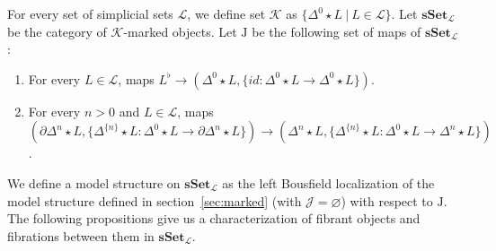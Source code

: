 \documentclass[reqno]{amsart}
\theoremstyle{definition}
\theoremstyle{remark}
\newcommand{\cat}[1]{\mathbf{#1}}
\newcommand{\sSet}{\cat{sSet}}
\newcommand{\K}{$\mathcal{K}$}
\newcommand{\join}{\star}
\newcommand{\J}{\mathrm{J}}
\numberwithin{figure}{section}
\begin{document}
For every set of simplicial sets $\mathcal{L}$, we define set $\mathcal{K}$ as $\{ \Delta^0 \join L\ |\ L \in \mathcal{L} \}$.
Let $\sSet_\mathcal{L}$ be the category of \K-marked objects.
Let $\J$ be the following set of maps of $\sSet_\mathcal{L}$:
\begin{enumerate}
\item For every $L \in \mathcal{L}$, maps $L^\flat \to (\Delta^0 \join L, \{ id : \Delta^0 \join L \to \Delta^0 \join L \})$.
\item For every $n > 0$ and $L \in \mathcal{L}$, maps $(\partial \Delta^n \join L, \{ \Delta^{\{n\}} \join L : \Delta^0 \join L \to \partial \Delta^n \join L \}) \to (\Delta^n \join L, \{ \Delta^{\{n\}} \join L : \Delta^0 \join L \to \Delta^n \join L \})$.
\end{enumerate}
We define a model structure on $\sSet_\mathcal{L}$ as the left Bousfield localization of the model structure
defined in section~\ref{sec:marked} (with $\mathcal{J} = \varnothing$) with respect to $\J$.
The following propositions give us a characterization of fibrant objects and fibrations between them in $\sSet_\mathcal{L}$.
\end{document}
